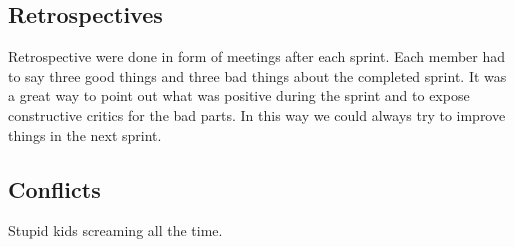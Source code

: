 \subsection{Retrospectives}
Retrospective were done in form of meetings after each sprint. Each member had to say three good things and three bad things about
the completed sprint. It was a great way to point out what was positive during the sprint
and to expose constructive critics for the bad parts. In this way we could always try to improve things in the next sprint.

\subsection{Conflicts}
Stupid kids screaming all the time.
